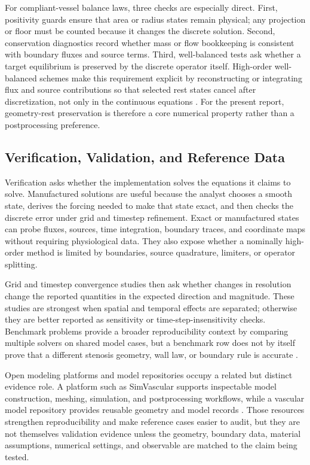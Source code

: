 For compliant-vessel balance laws, three checks are especially direct. First,
positivity guards ensure that area or radius states remain physical; any
projection or floor must be counted because it changes the discrete solution.
Second, conservation diagnostics record whether mass or flow bookkeeping is
consistent with boundary fluxes and source terms. Third, well-balanced tests
ask whether a target equilibrium is preserved by the discrete operator itself.
High-order well-balanced schemes make this requirement explicit by reconstructing
or integrating flux and source contributions so that selected rest states cancel
after discretization, not only in the continuous equations
\cite{PimentelGarciaEtAl2025HighOrderWellBalanced}. For the present report,
geometry-rest preservation is therefore a core numerical property rather than a
postprocessing preference.

\subsection{Verification, Validation, and Reference Data}
\label{subsec:numerical-methods-verification-validation}

Verification asks whether the implementation solves the equations it claims to
solve. Manufactured solutions are useful because the analyst chooses a smooth
state, derives the forcing needed to make that state exact, and then checks the
discrete error under grid and timestep refinement. Exact or manufactured states
can probe fluxes, sources, time integration, boundary traces, and coordinate
maps without requiring physiological data. They also expose whether a nominally
high-order method is limited by boundaries, source quadrature, limiters, or
operator splitting.

Grid and timestep convergence studies then ask whether changes in resolution
change the reported quantities in the expected direction and magnitude. These
studies are strongest when spatial and temporal effects are separated; otherwise
they are better reported as sensitivity or time-step-insensitivity checks.
Benchmark problems provide a broader reproducibility context by comparing
multiple solvers on shared model cases, but a benchmark row does not by itself
prove that a different stenosis geometry, wall law, or boundary rule is
accurate \cite{BoileauEtAl2015Benchmark}.

Open modeling platforms and model repositories occupy a related but distinct
evidence role. A platform such as SimVascular supports inspectable model
construction, meshing, simulation, and postprocessing workflows, while a
vascular model repository provides reusable geometry and model records
\cite{SimVascular2026Platform,SimVascular2026VascularModelRepository}. Those
resources strengthen reproducibility and make reference cases easier to audit,
but they are not themselves validation evidence unless the geometry, boundary
data, material assumptions, numerical settings, and observable are matched to
the claim being tested.

